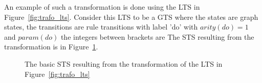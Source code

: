 An example of such a transformation is done using the LTS in Figure~\ref{fig:trafo_lts}. Consider this LTS to be a GTS where the states are graph states, the transitions are rule transitions with label 'do' with $\mathit{arity(do)} = 1$ and $\mathit{param(do)}$ the integers between brackets are The STS resulting from the transformation is in Figure~\ref{fig:trafo_basic_sts}.

\begin{figure}[ht]
  \begin{center}
    
  \end{center}
  \caption{The basic STS resulting from the transformation of the LTS in Figure~\ref{fig:trafo_lts}}
  \label{fig:trafo_basic_sts}
\end{figure}

